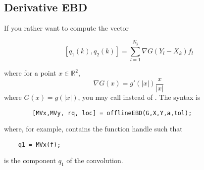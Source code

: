 \documentclass[]{article}
\begin{document}
\begin{itemize}
	\subsection{Derivative EBD}
	
	If you rather want to compute the vector
	
	\[[q_1(k),q_2(k)] = \sum_{l=1}^{N_y} \nabla{G}(Y_l - X_k)f_l\]
	
	where for a point $x \in \mathbb{R}^2$, 
	\[\nabla G(x) = g'(|x|) \frac{x}{|x|}\]
	where $G(x) = g(|x|)$, you may call  instead of . The syntax is 
	\begin{lstlisting}
		[MVx,MVy, rq, loc] = offlineEBD(G,X,Y,a,tol);
	\end{lstlisting}
	where, for example,  contains the function handle such that 
	\begin{lstlisting}
	q1 = MVx(f);
	\end{lstlisting}
	is the component $q_1$ of the convolution. 
		
\end{itemize}
\end{document}
